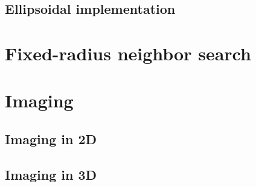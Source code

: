 \documentclass{article}
\begin{document}
    \subsection{Ellipsoidal implementation}\label{subsec:ellipsoidal-implementation}


    \section{Fixed-radius neighbor search}\label{sec:fixed-radius-neighbor-search}


    \section{Imaging}\label{sec:imaging}

    \subsection{Imaging in 2D}\label{subsec:imaging-in-2d}

    \subsection{Imaging in 3D}\label{subsec:imaging-in-3d}
\end{document}
